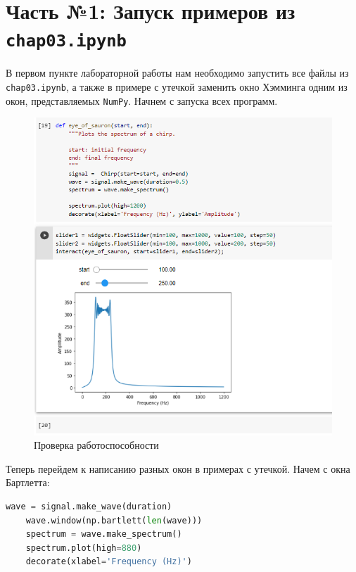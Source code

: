 \documentclass[a4paper]{article}
\begin{document}
    \newpage
        \section{Часть №1: Запуск примеров из \texttt{chap03.ipynb}}
            В первом пункте лабораторной работы нам необходимо запустить все файлы из \texttt{chap03.ipynb}, а также в примере с утечкой заменить окно Хэмминга одним из окон, представляемых \texttt{NumPy}.
            Начнем с запуска всех программ.
            
            \begin{figure}[h]
                \centering
                \includegraphics[width=\textwidth]{ex_1_all_working.png}
                \caption{Проверка работоспособности}
                \label{fig:ex_1_all_working}
            \end{figure}
            
            Теперь перейдем к написанию разных окон в примерах с утечкой. Начем с окна Бартлетта:
            
\begin{lstlisting}[language=Python, caption= Окно Бартлетта]
    wave = signal.make_wave(duration)
    wave.window(np.bartlett(len(wave)))
    spectrum = wave.make_spectrum()
    spectrum.plot(high=880)
    decorate(xlabel='Frequency (Hz)')
\end{lstlisting}               
            
\end{document}
